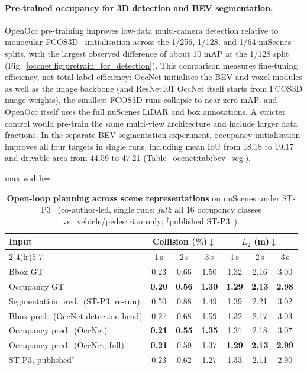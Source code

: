 \paragraph{Pre-trained occupancy for 3D detection and BEV segmentation.} OpenOcc pre-training improves low-data multi-camera detection relative to monocular FCOS3D~\cite{wang2021fcos3d} initialisation across the 1/256, 1/128, and 1/64 nuScenes splits, with the largest observed difference of about 10 mAP at the 1/128 split (Fig.~\ref{occnet:fig:pretrain_for_detection}). This comparison measures fine-tuning efficiency, not total label efficiency: OccNet initialises the BEV and voxel modules as well as the image backbone (and ResNet101 OccNet itself starts from FCOS3D image weights), the smallest FCOS3D runs collapse to near-zero mAP, and OpenOcc itself uses the full nuScenes LiDAR and box annotations. A stricter control would pre-train the same multi-view architecture and include larger data fractions. In the separate BEV-segmentation experiment, occupancy initialisation improves all four targets in single runs, including mean IoU from 18.18 to 19.17 and drivable area from 44.59 to 47.21 (Table~\ref{occnet:tab:bev_seg}).

\begin{table}[t]
  \centering
  \caption[Open-loop planning across scene representations]{\textbf{Open-loop planning across scene representations} on nuScenes under ST-P3~\cite{hu2022stp3} (co-author-led, single runs; \emph{full}: all 16 occupancy classes vs.\ vehicle/pedestrian only; $^{\dagger}$published ST-P3~\cite{hu2022stp3}).}
  \label{occnet:tab:planning}
  \small
  \begin{adjustbox}{max width=\linewidth}
  \begin{tabular}{lcccccc}
    \toprule
    \multirow{2}{*}{Input} & \multicolumn{3}{c}{Collision (\%)$\downarrow$} & \multicolumn{3}{c}{$L_2$ (m)$\downarrow$} \\
    \cmidrule(lr){2-4}\cmidrule(lr){5-7}
     & 1\,s & 2\,s & 3\,s & 1\,s & 2\,s & 3\,s \\
    \midrule
    Bbox GT      & 0.23 & 0.66 & 1.50 & 1.32 & 2.16 & 3.00 \\
    Occupancy GT & \textbf{0.20} & \textbf{0.56} & \textbf{1.30} & \textbf{1.29} & \textbf{2.13} & \textbf{2.98} \\
    \midrule
    Segmentation pred.\ (ST-P3, re-run) & 0.50 & 0.88 & 1.49 & 1.39 & 2.21 & 3.02 \\
    Bbox pred.\ (OccNet detection head) & 0.27 & 0.68 & 1.59 & 1.32 & 2.17 & 3.03 \\
    \rowcolor{perceive!10} Occupancy pred.\ (OccNet) & \textbf{0.21} & \textbf{0.55} & \textbf{1.35} & 1.31 & 2.18 & 3.07 \\
    \rowcolor{perceive!10} Occupancy pred.\ (OccNet, full) & \textbf{0.21} & 0.59 & 1.37 & \textbf{1.29} & \textbf{2.13} & \textbf{2.99} \\
    \midrule
    ST-P3, published$^{\dagger}$ & 0.23 & 0.62 & 1.27 & 1.33 & 2.11 & 2.90 \\
    \bottomrule
  \end{tabular}
  \end{adjustbox}
\end{table}

